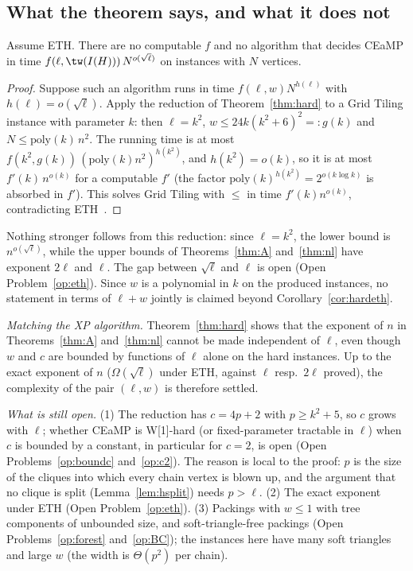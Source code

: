 \subsection{What the theorem says, and what it does not}
\begin{corollary}\label{cor:hardeth}
Assume ETH. There are no computable $f$ and no algorithm that decides CEaMP in time $f(\ell,\tw(I(H)))\,N^{o(\sqrt\ell)}$ on instances with $N$ vertices.
\end{corollary}
\begin{proof}
Suppose such an algorithm runs in time $f(\ell,w)N^{h(\ell)}$ with $h(\ell)=o(\sqrt\ell)$. Apply the reduction of Theorem~\ref{thm:hard} to a Grid Tiling instance with parameter $k$: then $\ell=k^2$, $w\le 24k(k^2+6)^2=:g(k)$ and $N\le \mathrm{poly}(k)\,n^2$. The running time is at most $f(k^2,g(k))\,(\mathrm{poly}(k)n^2)^{h(k^2)}$, and $h(k^2)=o(k)$, so it is at most $f'(k)\,n^{o(k)}$ for a computable $f'$ (the factor $\mathrm{poly}(k)^{h(k^2)}=2^{o(k\log k)}$ is absorbed in $f'$). This solves Grid Tiling with $\le$ in time $f'(k)n^{o(k)}$, contradicting ETH~\cite{Cygan15}.
\end{proof}
Nothing stronger follows from this reduction: since $\ell=k^2$, the lower bound is $n^{o(\sqrt\ell)}$, while the upper bounds of Theorems~\ref{thm:A} and~\ref{thm:nl} have exponent $2\ell$ and $\ell$. The gap between $\sqrt\ell$ and $\ell$ is open (Open Problem~\ref{op:eth}). Since $w$ is a polynomial in $k$ on the produced instances, no statement in terms of $\ell+w$ jointly is claimed beyond Corollary~\ref{cor:hardeth}.

\emph{Matching the XP algorithm.} Theorem~\ref{thm:hard} shows that the exponent of $n$ in Theorems~\ref{thm:A} and~\ref{thm:nl} cannot be made independent of $\ell$, even though $w$ and $c$ are bounded by functions of $\ell$ alone on the hard instances. Up to the exact exponent of $n$ ($\Omega(\sqrt\ell)$ under ETH, against $\ell$ resp.\ $2\ell$ proved), the complexity of the pair $(\ell,w)$ is therefore settled.

\emph{What is still open.} (1) The reduction has $c=4p+2$ with $p\ge k^2+5$, so $c$ grows with $\ell$; whether CEaMP is W[1]-hard (or fixed-parameter tractable in $\ell$) when $c$ is bounded by a constant, in particular for $c=2$, is open (Open Problems~\ref{op:boundc} and~\ref{op:c2}). The reason is local to the proof: $p$ is the size of the cliques into which every chain vertex is blown up, and the argument that no clique is split (Lemma~\ref{lem:hsplit}) needs $p>\ell$. (2) The exact exponent under ETH (Open Problem~\ref{op:eth}). (3) Packings with $w\le1$ with tree components of unbounded size, and soft-triangle-free packings (Open Problems~\ref{op:forest} and~\ref{op:BC}); the instances here have many soft triangles and large $w$ (the width is $\Theta(p^2)$ per chain).

